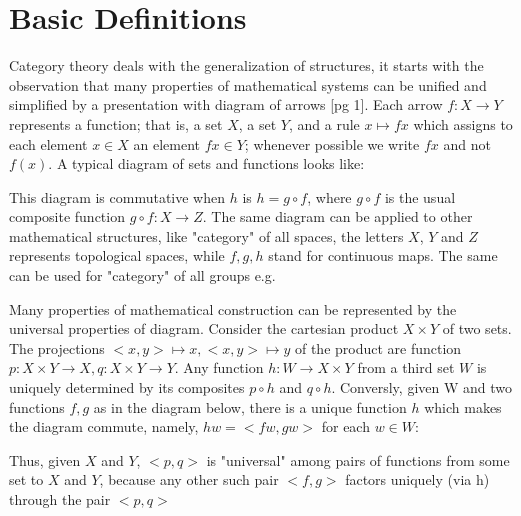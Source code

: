 \section*{Basic Definitions}

Category theory deals with the generalization of structures, it starts with the observation that many properties of mathematical systems can be unified and simplified by a presentation with diagram of arrows [pg 1]. Each arrow $f: X \to Y$ represents a function; that is, a set $X$, a set $Y$, and a rule $x \mapsto fx$ which assigns to each element $x \in X$ an element $fx \in Y$; whenever possible we write $fx$ and not $f(x)$. A typical diagram of sets and functions looks like: 
\begin{center}
\end{center}

This diagram is commutative when $h$ is $h = g \circ f$, where $g \circ f$ is the usual composite function $g \circ f: X \to Z$. The same diagram can be applied to other mathematical structures, like "category" of all spaces, the letters $X$, $Y$ and $Z$ represents topological spaces, while $f, g, h$ stand for continuous maps. The same can be used for "category" of all groups e.g.


Many properties of mathematical construction can be represented by the universal properties of diagram. Consider the cartesian product $X \times Y$ of two sets. The projections $<x,y> \mapsto x, <x, y> \mapsto y$ of the product are function $p: X \times Y \rightarrow X, q: X \times Y \rightarrow Y$. Any function $h: W \to X \times Y$ from a third set $W$ is uniquely determined by its composites $p \circ h$ and $q \circ h$. Conversly, given W and two functions $f, g$ as in the diagram below, there is a unique function $h$ which makes the diagram commute, namely, $hw = <fw, gw>$ for each $w \in W$:

\begin{center}
\end{center}

Thus, given $X$ and $Y$, $<p, q>$ is "universal" among pairs of functions from some set to $X$ and $Y$, because any other such pair $<f, g>$ factors uniquely (via h) through the pair $<p ,q>$

